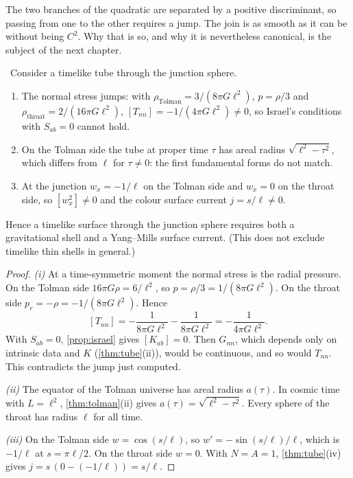The two branches of the quadratic are separated by a positive discriminant, so passing from one to the other requires a jump. The join is as smooth as it can be without being $C^2$. Why that is so, and why it is nevertheless canonical, is the subject of the next chapter.

\begin{theorem}\label{thm:timelikejoin}\ver\nogo\
Consider a timelike tube through the junction sphere.
\begin{enumerate}[label=(\roman*)]
\item The normal stress jumps: with $\rho_{\mathrm{Tolman}}=3/(8\pi G\ell^2)$, $p=\rho/3$ and $\rho_{\mathrm{throat}}=2/(16\pi G\ell^2)$, $[T_{nn}]=-1/(4\pi G\ell^2)\ne0$, so Israel's conditions with $S_{ab}=0$ cannot hold.
\item On the Tolman side the tube at proper time $\tau$ has areal radius $\sqrt{\ell^2-\tau^2}$, which differs from $\ell$ for $\tau\ne0$: the first fundamental forms do not match.
\item At the junction $w_x=-1/\ell$ on the Tolman side and $w_x=0$ on the throat side, so $[w_x^2]\ne0$ and the colour surface current $j=s/\ell\ne0$.
\end{enumerate}
Hence a timelike surface through the junction sphere requires both a gravitational shell and a Yang--Mills surface current. (This does not exclude timelike thin shells in general.)
\end{theorem}
\begin{proof}
\emph{(i)} At a time-symmetric moment the normal stress is the radial pressure. On the Tolman side $16\pi G\rho=6/\ell^2$, so $p=\rho/3=1/(8\pi G\ell^2)$. On the throat side $p_r=-\rho=-1/(8\pi G\ell^2)$. Hence
\[
[T_{nn}]=-\frac1{8\pi G\ell^2}-\frac1{8\pi G\ell^2}=-\frac1{4\pi G\ell^2}.
\]
With $S_{ab}=0$, \cref{prop:israel} gives $[K_{ab}]=0$. Then $G_{nn}$, which depends only on intrinsic data and $K$ (\cref{thm:tube}(ii)), would be continuous, and so would $T_{nn}$. This contradicts the jump just computed.

\emph{(ii)} The equator of the Tolman universe has areal radius $a(\tau)$. In cosmic time with $L=\ell^2$, \cref{thm:tolman}(ii) gives $a(\tau)=\sqrt{\ell^2-\tau^2}$. Every sphere of the throat has radius $\ell$ for all time.

\emph{(iii)} On the Tolman side $w=\cos(s/\ell)$, so $w'=-\sin(s/\ell)/\ell$, which is $-1/\ell$ at $s=\pi\ell/2$. On the throat side $w=0$. With $N=A=1$, \cref{thm:tube}(iv) gives $j=s\,(0-(-1/\ell))=s/\ell$.
\end{proof}


